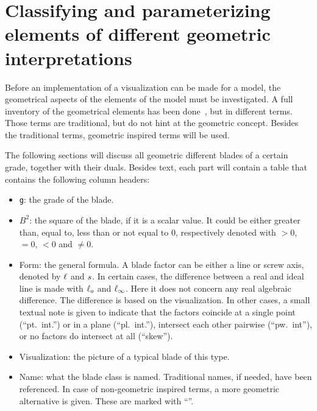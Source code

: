 \section{Classifying and parameterizing elements of different geometric interpretations}
\label{ch:research}

Before an implementation of a visualization can be made for a model, the geometrical aspects of the elements of the model must be investigated.  A full inventory of the geometrical elements has been done~\cite[Chapter 3]{Pottmann}, but in different terms.  Those terms are traditional, but do not hint at the geometric concept.  Besides the traditional terms, geometric inspired terms will be used.  

The following sections will discuss all geometric different blades of a certain grade, together with their duals.  Besides text, each part will contain a table that contains the following column headers:
\begin{itemize}
  \item \texttt{g}: the grade of the blade.
  \item $B^2$: the square of the blade, if it is a scalar value.  It could be either greater than, equal to, less than or not equal to 0, respectively denoted with $> 0$, $= 0$, $< 0$ and $\not= 0$.
  \item Form: the general formula.  A blade factor can be either a line or screw axis, denoted by $\ell$ and $s$.  In certain cases, the difference between a real and ideal line is made with $\ell_o$ and $\ell_\infty$.  Here it does not concern any real algebraic difference.  The difference is based on the visualization.  In other cases, a small textual note is given to indicate that the factors coincide at a single point (``pt.\ int.'') or in a plane (``pl.\ int.''), intersect each other pairwise (``pw.\ int''), or no factors do intersect at all (``skew'').
  \item Visualization: the picture of a typical blade of this type.
  \item Name: what the blade class is named.  Traditional names, if needed, have been referenced.  In case of non-geometric inspired terms, a more geometric alternative is given.  These are marked with ``\newterm''.
\end{itemize}

